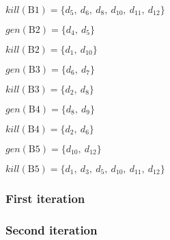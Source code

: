 $kill(\text{B1}) = \{d_5, ~d_6, ~d_8, ~d_{10}, ~d_{11}, ~d_{12}\}$

$gen(\text{B2}) = \{d_4,~d_5\}$

$kill(\text{B2}) = \{d_1,~ d_{10}\}$

$gen(\text{B3}) = \{d_6,~ d_7\}$

$kill(\text{B3}) = \{d_2,~ d_8\}$

$gen(\text{B4}) = \{d_8,~ d_9\}$

$kill(\text{B4}) = \{d_2,~ d_6\}$

$gen(\text{B5}) = \{d_{10},~ d_{12}\}$

$kill(\text{B5}) = \{d_1,~ d_3,~ d_5,~ d_{10},~ d_{11},~ d_{12}\}$

\subsubsection{First iteration}
\newcommand{\INBone}	{$\emptyset$}
\newcommand{\OUTBone}	{$\{d_{1},~ d_2,~ d_3\}$}
\newcommand{\INBtwo}	{\OUTBone}
\newcommand{\OUTBtwo}	{$\{d_2,~ d_3,~ d_4,~ d_5\}$}
\newcommand{\INBthree}	{\OUTBtwo}
\newcommand{\OUTBthree}	{$\{d_3,~ d_4,~ d_5,~ d_6,~ d_7\}$}
\newcommand{\INBfour}	{\OUTBtwo}
\newcommand{\OUTBfour}	{$\{d_3,~ d_4,~ d_5,~ d_8,~ d_9\}$}
\newcommand{\INBfive}	{$\{d_3,~ d_4,~ d_5,~ d_6,~ d_7,~ d_8,~ d_9\}$}
\newcommand{\OUTBfive}	{$\{d_1,~ d_4,~ d_6,~ d_7,~ d_8,~ d_9,~ d_{10},~ d_{12}\}$}



\subsubsection{Second iteration}
\renewcommand{\INBone}		{$\{d_1,~ d_4,~ d_6,~ d_7,~ d_8,~ d_9,~ d_{10},~ d_{12}\}$}
\renewcommand{\OUTBone}		{$\{d_1,~ d_2,~ d_3,~ d_4,~ d_7,~ d_9\}$}
\renewcommand{\INBtwo}		{\OUTBone}
\renewcommand{\OUTBtwo}		{$\{d_2,~ d_3,~ d_4,~ d_5,~ d_7,~ d_9\}$}
\renewcommand{\INBthree}	{\OUTBtwo}
\renewcommand{\OUTBthree}	{$\{d_3,~ d_4,~ d_5,~ d_6,~ d_7,~ d_9\}$}
\renewcommand{\INBfour}		{\OUTBtwo}
\renewcommand{\OUTBfour}	{$\{d_3,~ d_4,~ d_5,~ d_7,~ d_8,~ d_9\}$}
\renewcommand{\INBfive}		{$\{d_3,~ d_4,~ d_5,~ d_6,~ d_7,~ d_8,~ d_9\}$}
\renewcommand{\OUTBfive}	{$\{d_4,~ d_6,~ d_7,~ d_8,~ d_9,~ d_{10},~ d_{12}\}$}

